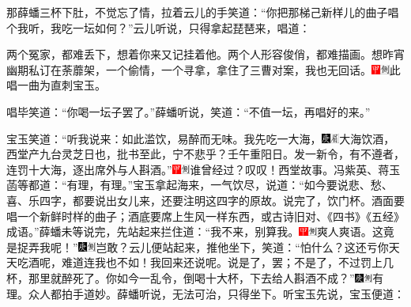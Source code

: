 那薛蟠三杯下肚，不觉忘了情，拉着云儿的手笑道：``你把那梯己新样儿的曲子唱个我听，我吃一坛如何？''云儿听说，只得拿起琵琶来，唱道：

两个冤家，都难丢下，想着你来又记挂着他。两个人形容俊俏，都难描画。想昨宵幽期私订在荼蘼架，一个偷情，一个寻拿，拿住了三曹对案，我也无回话。{\includegraphics[width=3mm]{../Images/00002}\includegraphics[width=3mm]{../Images/00011}\footnotesize \kaishu 此唱一曲为直刺宝玉。}

唱毕笑道：``你喝一坛子罢了。''薛蟠听说，笑道：``不值一坛，再唱好的来。''

宝玉笑道：``听我说来：如此滥饮，易醉而无味。我先吃一大海，{\includegraphics[width=3mm]{../Images/00004}\includegraphics[width=3mm]{../Images/00010}\footnotesize \kaishu 大海饮酒，西堂产九台灵芝日也，批书至此，宁不悲乎？壬午重阳日。}发一新令，有不遵者，连罚十大海，逐出席外与人斟酒。''{\includegraphics[width=3mm]{../Images/00002}\includegraphics[width=3mm]{../Images/00011}\footnotesize \kaishu 谁曾经过？叹叹！西堂故事。}冯紫英、蒋玉菡等都道：``有理，有理。''宝玉拿起海来，一气饮尽，说道：``如今要说悲、愁、喜、乐四字，都要说出女儿来，还要注明这四字的原故。说完了，饮门杯。酒面要唱一个新鲜时样的曲子；酒底要席上生风一样东西，或古诗旧对、《四书》《五经》成语。''薛蟠未等说完，先站起来拦住道：``我不来，别算我。{\includegraphics[width=3mm]{../Images/00002}\includegraphics[width=3mm]{../Images/00011}\footnotesize \kaishu 爽人爽语。}这竟是捉弄我呢！''{\includegraphics[width=3mm]{../Images/00004}\includegraphics[width=3mm]{../Images/00011}\footnotesize \kaishu 岂敢？}云儿便站起来，推他坐下，笑道：``怕什么？这还亏你天天吃酒呢，难道连我也不如！我回来还说呢。说是了，罢；不是了，不过罚上几杯，那里就醉死了。你如今一乱令，倒喝十大杯，下去给人斟酒不成？''{\includegraphics[width=3mm]{../Images/00004}\includegraphics[width=3mm]{../Images/00011}\footnotesize \kaishu 有理。}众人都拍手道妙。薛蟠听说，无法可治，只得坐下。听宝玉先说，宝玉便道：

